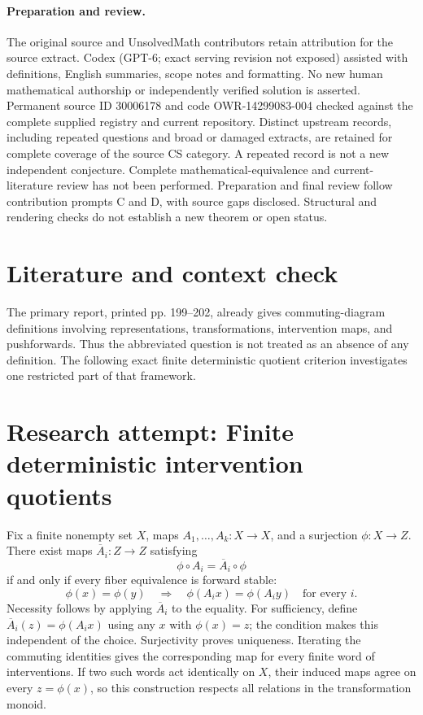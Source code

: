 \documentclass[11pt]{article}
\begin{document}
\paragraph{Preparation and review.}
The original source and UnsolvedMath contributors retain attribution for the source extract. Codex (GPT-6; exact serving revision not exposed) assisted with definitions, English summaries, scope notes and formatting. No new human mathematical authorship or independently verified solution is asserted. Permanent source ID 30006178 and code OWR-14299083-004 checked against the complete supplied registry and current repository. Distinct upstream records, including repeated questions and broad or damaged extracts, are retained for complete coverage of the source CS category. A repeated record is not a new independent conjecture. Complete mathematical-equivalence and current-literature review has not been performed. Preparation and final review follow contribution prompts C and D, with source gaps disclosed. Structural and rendering checks do not establish a new theorem or open status.
\label{end:30006178}

\section{Literature and context check}
The primary report, printed pp. 199--202, already gives commuting-diagram definitions involving representations, transformations, intervention maps, and pushforwards. Thus the abbreviated question is not treated as an absence of any definition. The following exact finite deterministic quotient criterion investigates one restricted part of that framework.
\section{Research attempt: Finite deterministic intervention quotients}

Fix a finite nonempty set $X$, maps $A_1,\ldots,A_k:X\to X$, and a surjection $\phi:X\to Z$. There exist maps $\overline A_i:Z\to Z$ satisfying
\[
\phi\circ A_i=\overline A_i\circ\phi
\]
if and only if every fiber equivalence is forward stable:
\[
\phi(x)=\phi(y)\quad\Longrightarrow\quad
\phi(A_i x)=\phi(A_i y)\quad\text{for every }i.
\]
Necessity follows by applying $\overline A_i$ to the equality. For sufficiency, define $\overline A_i(z)=\phi(A_i x)$ using any $x$ with $\phi(x)=z$; the condition makes this independent of the choice. Surjectivity proves uniqueness. Iterating the commuting identities gives the corresponding map for every finite word of interventions. If two such words act identically on $X$, their induced maps agree on every $z=\phi(x)$, so this construction respects all relations in the transformation monoid.
\end{document}
